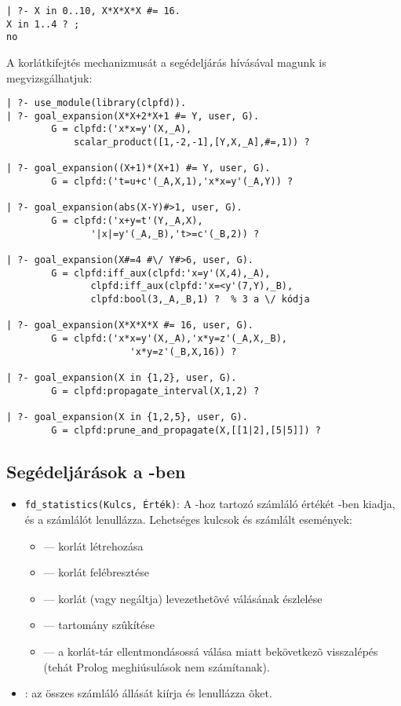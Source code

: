 \begin{verbatim}
| ?- X in 0..10, X*X*X*X #= 16.
X in 1..4 ? ;
no
\end{verbatim}

A korlátkifejtés mechanizmusát a  segédeljárás
hívásával magunk is megvizsgálhatjuk:

\begin{verbatim}
| ?- use_module(library(clpfd)).
| ?- goal_expansion(X*X+2*X+1 #= Y, user, G).
        G = clpfd:('x*x=y'(X,_A),
            scalar_product([1,-2,-1],[Y,X,_A],#=,1)) ? 

| ?- goal_expansion((X+1)*(X+1) #= Y, user, G).
        G = clpfd:('t=u+c'(_A,X,1),'x*x=y'(_A,Y)) ? 

| ?- goal_expansion(abs(X-Y)#>1, user, G).
        G = clpfd:('x+y=t'(Y,_A,X),
               '|x|=y'(_A,_B),'t>=c'(_B,2)) ? 

| ?- goal_expansion(X#=4 #\/ Y#>6, user, G).
        G = clpfd:iff_aux(clpfd:'x=y'(X,4),_A),
               clpfd:iff_aux(clpfd:'x=<y'(7,Y),_B),
               clpfd:bool(3,_A,_B,1) ?  % 3 a \/ kódja

| ?- goal_expansion(X*X*X*X #= 16, user, G).
        G = clpfd:('x*x=y'(X,_A),'x*y=z'(_A,X,_B),
                      'x*y=z'(_B,X,16)) ? 

| ?- goal_expansion(X in {1,2}, user, G).
        G = clpfd:propagate_interval(X,1,2) ? 

| ?- goal_expansion(X in {1,2,5}, user, G).
        G = clpfd:prune_and_propagate(X,[[1|2],[5|5]]) ?
\end{verbatim}

\subsection{Segédeljárások a \Clpfd -ben}

\begin{itemize}
\item {\tt fd\_statistics(Kulcs, Érték)}: A -hoz tartozó
        számláló értékét -ben kiadja, és a számlálót lenullázza.
        Lehetséges kulcsok és számlált események: 
\begin{itemize}
\item {} --- korlát létrehozása
\item {} --- korlát felébresztése
\item {} --- korlát (vagy negáltja) levezethetõvé válásának
        észlelése
\item {}    --- tartomány szûkítése
\item {}  --- a korlát-tár ellentmondásossá válása miatt
        bekövetkezõ visszalépés (tehát Prolog meghiúsulások nem számítanak).
\end{itemize}
\item {}: az összes számláló állását kiírja és
        lenullázza õket.
\end{itemize}

